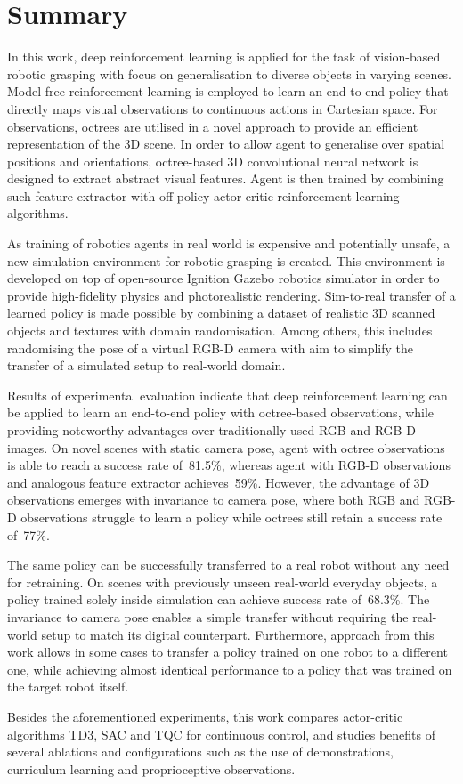 \chapter*{Summary}

In this work, deep reinforcement learning is applied for the task of vision-based robotic grasping with focus on generalisation to diverse objects in varying scenes. Model-free reinforcement learning is employed to learn an end-to-end policy that directly maps visual observations to continuous actions in Cartesian space. For observations, octrees are utilised in a novel approach to provide an efficient representation of the 3D scene. In order to allow agent to generalise over spatial positions and orientations, octree-based 3D convolutional neural network is designed to extract abstract visual features. Agent is then trained by combining such feature extractor with off-policy actor-critic reinforcement learning algorithms.

As training of robotics agents in real world is expensive and potentially unsafe, a new simulation environment for robotic grasping is created. This environment is developed on top of open-source Ignition Gazebo robotics simulator in order to provide high-fidelity physics and photorealistic rendering. Sim-to-real transfer of a learned policy is made possible by combining a dataset of realistic 3D scanned objects and textures with domain randomisation. Among others, this includes randomising the pose of a virtual RGB-D camera with aim to simplify the transfer of a simulated setup to real-world domain.

Results of experimental evaluation indicate that deep reinforcement learning can be applied to learn an end-to-end policy with octree-based observations, while providing noteworthy advantages over traditionally used RGB and RGB-D images. On novel scenes with static camera pose, agent with octree observations is able to reach a success rate of~81.5\%, whereas agent with RGB-D observations and analogous feature extractor achieves~59\%. However, the advantage of 3D observations emerges with invariance to camera pose, where both RGB and RGB-D observations struggle to learn a policy while octrees still retain a success rate of~77\%.

The same policy can be successfully transferred to a real robot without any need for retraining. On scenes with previously unseen real-world everyday objects, a policy trained solely inside simulation can achieve success rate of~68.3\%. The invariance to camera pose enables a simple transfer without requiring the real-world setup to match its digital counterpart. Furthermore, approach from this work allows in some cases to transfer a policy trained on one robot to a different one, while achieving almost identical performance to a policy that was trained on the target robot itself.

Besides the aforementioned experiments, this work compares actor-critic algorithms TD3, SAC and TQC for continuous control, and studies benefits of several ablations and configurations such as the use of demonstrations, curriculum learning and proprioceptive observations.
